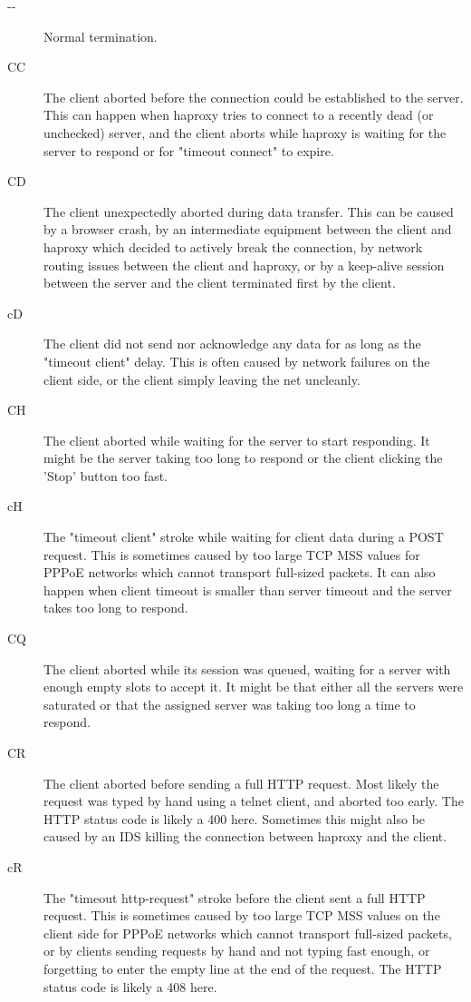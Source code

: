 \begin{description}
     \item[{-}{-}]
          Normal termination.
     \item[CC]   
          The client aborted before the connection could be established to the
          server. This can happen when haproxy tries to connect to a recently
          dead (or unchecked) server, and the client aborts while haproxy is
          waiting for the server to respond or for "timeout connect" to expire.
     \item[CD]
          The client unexpectedly aborted during data transfer. This can be
          caused by a browser crash, by an intermediate equipment between the
          client and haproxy which decided to actively break the connection,
          by network routing issues between the client and haproxy, or by a
          keep-alive session between the server and the client terminated first
          by the client.
     \item[cD]
          The client did not send nor acknowledge any data for as long as the
          "timeout client" delay. This is often caused by network failures on
          the client side, or the client simply leaving the net uncleanly.
     \item[CH]
          The client aborted while waiting for the server to start responding.
          It might be the server taking too long to respond or the client
          clicking the 'Stop' button too fast.
     \item[cH]
          The "timeout client" stroke while waiting for client data during a
          POST request. This is sometimes caused by too large TCP MSS values
          for PPPoE networks which cannot transport full-sized packets. It can
          also happen when client timeout is smaller than server timeout and
          the server takes too long to respond.
     \item[CQ]
          The client aborted while its session was queued, waiting for a server
          with enough empty slots to accept it. It might be that either all the
          servers were saturated or that the assigned server was taking too
          long a time to respond.
     \item[CR]
          The client aborted before sending a full HTTP request. Most likely
          the request was typed by hand using a telnet client, and aborted
          too early. The HTTP status code is likely a 400 here. Sometimes this
          might also be caused by an IDS killing the connection between haproxy
          and the client.
     \item[cR]
          The "timeout http-request" stroke before the client sent a full HTTP
          request. This is sometimes caused by too large TCP MSS values on the
          client side for PPPoE networks which cannot transport full-sized
          packets, or by clients sending requests by hand and not typing fast
          enough, or forgetting to enter the empty line at the end of the
          request. The HTTP status code is likely a 408 here.


\end{description}
